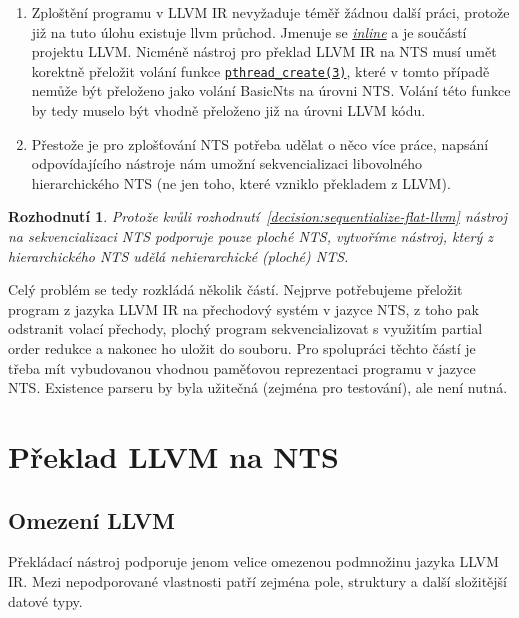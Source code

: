 \documentclass[12pt]{fithesis2}
\newtheorem{decision}  {Rozhodnutí}
\begin{document}
\begin{enumerate}
\item Zploštění programu v LLVM IR nevyžaduje téměř žádnou další práci, protože již na tuto úlohu existuje llvm průchod. Jmenuje se
\href{http://llvm.org/docs/Passes.html#inline-function-integration-inlining}
{\textit{inline}} a je součástí projektu LLVM. Nicméně nástroj pro překlad LLVM IR na NTS musí umět korektně přeložit volání funkce
\href{http://man7.org/linux/man-pages/man3/pthread\_create.3.html}
{\texttt{pthread\_create(3)}}, které v tomto případě nemůže být přeloženo jako volání BasicNts na úrovni NTS. Volání této funkce by tedy muselo být vhodně přeloženo již na úrovni LLVM kódu.

\item Přestože je pro zplošťování NTS potřeba udělat o něco více práce, napsání odpovídajícího nástroje nám umožní sekvencializaci libovolného hierarchického NTS (ne jen toho, které vzniklo překladem z LLVM).
\end{enumerate}

\begin{decision}\label{decision:do-nts-flattening}
Protože kvůli rozhodnutí~\ref{decision:sequentialize-flat-llvm} nástroj na sekvencializaci NTS podporuje pouze ploché NTS, vytvoříme nástroj, který z hierarchického NTS udělá nehierarchické (ploché) NTS.
\end{decision}

Celý problém se tedy rozkládá několik částí. Nejprve potřebujeme přeložit program z jazyka LLVM IR na přechodový systém v jazyce NTS, z toho pak odstranit volací přechody, plochý program sekvencializovat s využitím partial order redukce a nakonec ho uložit do souboru. Pro spolupráci těchto částí je třeba mít vybudovanou vhodnou paměťovou reprezentaci programu v jazyce NTS. Existence parseru by byla užitečná (zejména pro testování), ale není nutná.




\chapter{Překlad LLVM na NTS}
\label{sec:translation}
\section{Omezení LLVM}
Překládací nástroj podporuje jenom velice omezenou podmnožinu jazyka LLVM IR. Mezi nepodporované vlastnosti patří zejména pole, struktury a další složitější datové typy.
\end{document}
